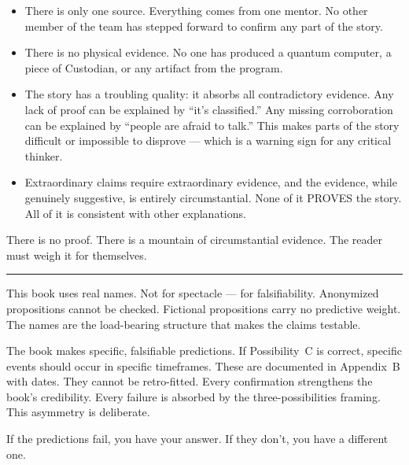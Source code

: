 \begin{itemize}
\item There is only one source. Everything comes from one mentor. No other member of the team has stepped forward to confirm any part of the story.
\item There is no physical evidence. No one has produced a quantum computer, a piece of Custodian, or any artifact from the program.
\item The story has a troubling quality: it absorbs all contradictory evidence. Any lack of proof can be explained by ``it's classified.'' Any missing corroboration can be explained by ``people are afraid to talk.'' This makes parts of the story difficult or impossible to disprove --- which is a warning sign for any critical thinker.
\item Extraordinary claims require extraordinary evidence, and the evidence, while genuinely suggestive, is entirely circumstantial. None of it PROVES the story. All of it is consistent with other explanations.
\end{itemize}

There is no proof. There is a mountain of circumstantial evidence. The reader must weigh it for themselves.

\vspace{1cm}\noindent\rule{0.5\textwidth}{0.5pt}\vspace{0.5cm}

This book uses real names. Not for spectacle --- for falsifiability. Anonymized propositions cannot be checked. Fictional propositions carry no predictive weight. The names are the load-bearing structure that makes the claims testable.

The book makes specific, falsifiable predictions. If Possibility~C is correct, specific events should occur in specific timeframes. These are documented in Appendix~B with dates. They cannot be retro-fitted. Every confirmation strengthens the book's credibility. Every failure is absorbed by the three-possibilities framing. This asymmetry is deliberate.

If the predictions fail, you have your answer. If they don't, you have a different one.

\chapterreturn
